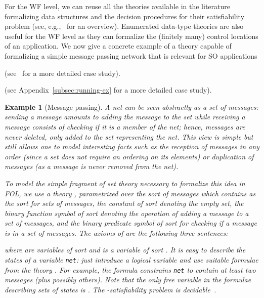 \documentclass[conference]{IEEEtran}
\newtheorem{example}{Example}
\newcommand{\close}{\IEEEQEDclosed}
\begin{document}
For the WF level, we can reuse all the theories available in the
literature formalizing data structures and the decision procedures for
their satisfiability problem (see, e.g.,~\cite{sebastiani} for an
overview).  Enumerated data-type theories are also useful for the WF
level as they can formalize the (finitely many) control locations of
an application.  We now give a concrete example of a theory capable of
formalizing a simple message passing network that is relevant for SO
applications 
\begin{SHORT}
(see~\cite{BRV-TR09} for a more detailed case study).
\end{SHORT} 
\begin{LONG}
(see Appendix~\ref{subsec:running-ex} for a more detailed case study).
\end{LONG}
\begin{example}[Message passing]
  \label{ex:msg-pass}
  A net can be seen abstractly as a set of messages: sending a message
  amounts to adding the message to the set while receiving a message
  consists of checking if it is a member of the net; hence, messages
  are never deleted, only added to the set representing the net.  This
  view is simple but still allows one to model interesting facts such
  as the reception of messages in any order (since a set does not
  require an ordering on its elements) or duplication of messages (as
  a message is never removed from the net).

  To model the simple fragment of set theory necessary to formalize
  this idea in FOL, we use a theory ,
  parametrized over the sort  of messages which contains
   as the sort for sets of messages, the constant
   of sort  denoting the empty set,
  the binary function symbol  of sort  denoting the
  operation of adding a message to a set of messages, and the binary
  predicate symbol  of sort  for checking if a message is in a set of
  messages. The axioms of  are the
  following three sentences:
  
  where  are variables of sort  and  is a
  variable of sort .  It is easy to describe the
  states of a variable \texttt{net}: just introduce a logical variable
   and use suitable formulae from the theory
  .  For example,
  the formula  constrains
  \texttt{net} to contain at least two messages (plus possibly
  others).  Note that the only free variable in the formulae
  describing sets of states is .  The
  -satisfiability problem is
  decidable~\cite{ic03}.  \hfill \close
\end{example}
\end{document}
